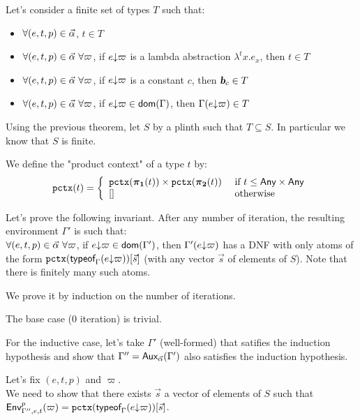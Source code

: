 \documentclass[a4paper]{article}
\theoremstyle{definition}
\begin{document}
    Let's consider a finite set of types $T$ such that:
    \begin{itemize}
      \item $\forall (e,t,p) \in \vec \alpha$, $t \in T$
      \item $\forall (e,t,p) \in \vec \alpha\ \forall \varpi$, if $e{\downarrow}\varpi$ is a lambda abstraction $\lambda^tx.e_x$, then $t \in T$
      \item $\forall (e,t,p) \in \vec \alpha\ \forall \varpi$, if $e{\downarrow}\varpi$ is a constant $c$, then $\basic{c} \in T$
      \item $\forall (e,t,p) \in \vec \alpha\ \forall \varpi$, if $e{\downarrow}\varpi \in \textsf{dom}(\Gamma)$, then $\Gamma(e{\downarrow}\varpi) \in T$
    \end{itemize}

    Using the previous theorem, let $S$ by a plinth such that $T \subseteq S$. In particular we know that $S$ is finite.

    We define the "product context" of a type $t$ by:
    \[
      \texttt{pctx}(t)=\left\{
        \begin{array}{ll}
          \texttt{pctx}(\boldsymbol{\pi}_{\boldsymbol 1}(t))\times \texttt{pctx}(\boldsymbol{\pi}_{\boldsymbol 2}(t)) & \text{ if } t \leq \textsf{Any}\times \textsf{Any}\\
          {[}] & \text{ otherwise}
        \end{array}  
      \right.
    \]

    Let's prove the following invariant. After any number of iteration, the resulting environment $\Gamma'$ is such that:\\
    $\forall (e,t,p) \in \vec \alpha\ \forall \varpi$, if $e{\downarrow}\varpi \in \textsf{dom}(\Gamma')$, then $\Gamma'(e{\downarrow}\varpi)$ has a DNF with only atoms of the form
    $\texttt{pctx}(\textsf{typeof}_{\Gamma}(e{\downarrow}\varpi))[\vec s]$ (with any vector $\vec s$ of elements of $S$).
    Note that there is finitely many such atoms.
    
    We prove it by induction on the number of iterations.

    The base case (0 iteration) is trivial.

    For the inductive case, let's take $\Gamma'$ (well-formed) that satifies the induction hypothesis
    and show that $\Gamma'' = \textsf{Aux}_{\vec \alpha}(\Gamma')$ also satisfies the induction hypothesis.

    Let's fix $(e,t,p)$ and $\varpi$.\\
    We need to show that there exists $\vec s$ a vector of elements of $S$ such that $\textsf{Env}^{p}_{\Gamma'',e,t} (\varpi) = \texttt{pctx}(\textsf{typeof}_{\Gamma}(e{\downarrow}\varpi))[\vec s]$.
    
\end{document}
